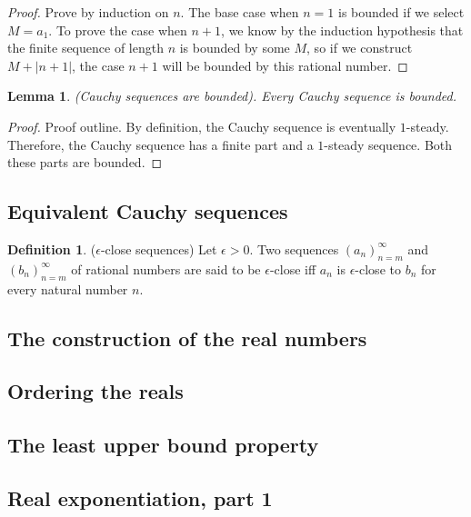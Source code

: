 \documentclass[12pt]{article}
\newtheorem{lemma}[theorem]{Lemma}
\theoremstyle{definition}
\newtheorem{definition}[theorem]{Definition}
\theoremstyle{remark}
\begin{document}
\begin{proof}
    Prove by induction on $n$. The base case when $n = 1$ is bounded if we select $M = a_1$. To prove the case when $n + 1$, we know by the induction hypothesis that the finite sequence of length $n$ is bounded by some $M$, so if we construct $M + |n+1|$, the case $n+1$ will be bounded by this rational number.
\end{proof}

\begin{lemma}
    (Cauchy sequences are bounded). Every Cauchy sequence is bounded.
\end{lemma}

\begin{proof}
    Proof outline. By definition, the Cauchy sequence is eventually $1$-steady. Therefore, the Cauchy sequence has a finite part and a $1$-steady sequence. Both these parts are bounded.
\end{proof}

\subsection{Equivalent Cauchy sequences}

\begin{definition}
    ($\epsilon$-close sequences) Let $\epsilon > 0$. Two sequences $(a_n)_{n=m}^\infty$ and $(b_n)_{n=m}^\infty$ of rational numbers are said to be $\epsilon$-close iff $a_n$ is $\epsilon$-close to $b_n$ for every natural number $n$.
\end{definition}

\subsection{The construction of the real numbers}
\subsection{Ordering the reals}
\subsection{The least upper bound property}
\subsection{Real exponentiation, part 1}
\end{document}
